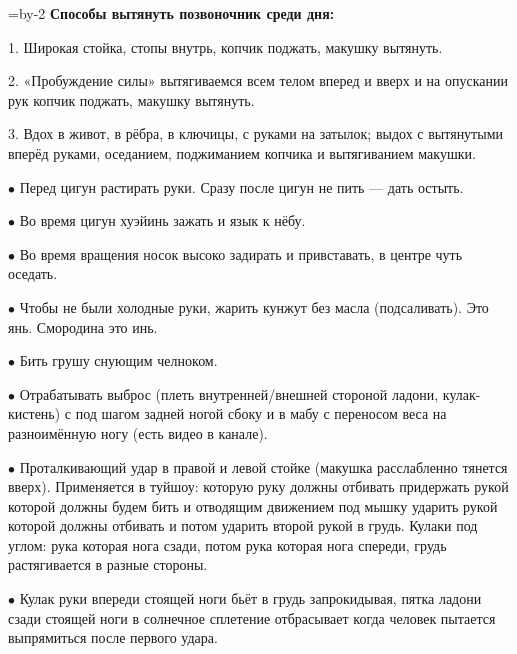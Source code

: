\pdfvorigin=1.5cm
\pdfhorigin=1.5cm
\hsize=\pdfpagewidth \advance\hsize by-2\pdfhorigin
\vsize=25cm
{\bf Способы вытянуть позвоночник среди дня:}

\item{1.} Широкая стойка, стопы внутрь, копчик поджать, макушку вытянуть.

\item{2.} «Пробуждение силы» вытягиваемся всем телом вперед и вверх и на опускании
рук копчик поджать, макушку вытянуть.

\item{3.} Вдох в живот, в рёбра, в ключицы, с руками на затылок;
выдох с вытянутыми вперёд руками, оседанием, поджиманием копчика и
вытягиванием макушки.

\bigskip

\item{$\bullet$} Перед цигун растирать руки. Сразу после цигун не пить --- дать остыть.

\item{$\bullet$} Во время цигун хуэйинь зажать и язык к нёбу.

\item{$\bullet$} Во время вращения носок высоко задирать и привставать, в центре чуть оседать.

\item{$\bullet$} Чтобы не были холодные руки, жарить кунжут без масла (подсаливать).
Это янь. Смородина это инь.

\item{$\bullet$} Бить грушу снующим челноком.

\item{$\bullet$} Отрабатывать выброс (плеть внутренней/внешней стороной ладони, кулак-кистень) с под шагом задней ногой сбоку и в мабу с переносом веса на разноимённую ногу (есть видео в канале).

\item{$\bullet$} Проталкивающий удар в правой и левой стойке (макушка расслабленно тянется вверх).
Применяется в туйшоу: которую руку должны отбивать придержать рукой которой должны будем бить и отводящим движением под мышку ударить рукой которой должны отбивать и потом ударить второй рукой в грудь. Кулаки под углом: рука которая нога сзади, потом рука которая нога спереди, грудь растягивается в разные стороны.

\item{$\bullet$} Кулак руки впереди стоящей ноги бьёт в грудь запрокидывая, пятка ладони сзади стоящей ноги в солнечное сплетение отбрасывает когда человек пытается выпрямиться после первого удара.

